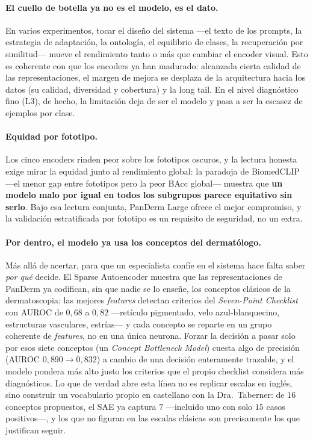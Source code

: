 \paragraph{El cuello de botella ya no es el modelo, es el dato.} En
varios experimentos, tocar el diseño del sistema ---el texto de los
prompts, la estrategia de adaptación, la ontología, el equilibrio de
clases, la recuperación por similitud--- mueve el rendimiento tanto o
más que cambiar el encoder visual. Esto es coherente con que los
encoders ya han madurado: alcanzada cierta calidad de las
representaciones, el margen de mejora se desplaza de la arquitectura
hacia los datos (su calidad, diversidad y cobertura) y la long tail. En
el nivel diagnóstico fino (L3), de hecho, la limitación deja de ser el
modelo y pasa a ser la escasez de ejemplos por clase.

\paragraph{Equidad por fototipo.}
\label{sec:disc-equidad}
Los cinco encoders rinden peor sobre los fototipos oscuros, y la lectura
honesta exige mirar la equidad junto al rendimiento global: la paradoja
de BiomedCLIP ---el menor gap entre fototipos pero la peor BAcc
global--- muestra que \textbf{un modelo malo por igual en todos los
subgrupos parece equitativo sin serlo}. Bajo esa lectura conjunta,
PanDerm Large ofrece el mejor compromiso, y la validación
estratificada por fototipo es un requisito de seguridad, no un extra.

\paragraph{Por dentro, el modelo ya usa los conceptos del dermatólogo.}
Más allá de acertar, para que un especialista confíe en el sistema hace
falta saber \emph{por qué} decide. El Sparse Autoencoder muestra que las
representaciones de PanDerm ya codifican, sin que nadie se lo enseñe, los
conceptos clásicos de la dermatoscopia: las mejores \emph{features}
detectan criterios del \emph{Seven-Point Checklist} con AUROC de $0{,}68$
a $0{,}82$ ---retículo pigmentado, velo azul-blanquecino, estructuras
vasculares, estrías--- y cada concepto se reparte en un grupo coherente de
\emph{features}, no en una única neurona. Forzar la decisión a pasar solo
por esos siete conceptos (un \emph{Concept Bottleneck Model}) cuesta algo
de precisión (AUROC $0{,}890 \to 0{,}832$) a cambio de una decisión
enteramente trazable, y el modelo pondera más alto justo los criterios que
el propio checklist considera más diagnósticos. Lo que de verdad abre esta
línea no es replicar escalas en inglés, sino construir un vocabulario
propio en castellano con la Dra.~Taberner: de $16$ conceptos propuestos, el
SAE ya captura $7$ ---incluido uno con solo $15$ casos positivos---, y los
que no figuran en las escalas clásicas son precisamente los que justifican
seguir.

